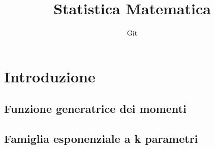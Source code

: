 \documentclass[11pt]{article}
\title{Statistica Matematica}
\author{Git}
\date{}
\begin{document}
\maketitle


\section{Introduzione}
\subsection{Funzione generatrice dei momenti}
\subsection{Famiglia esponenziale a k parametri}

\end{document}
